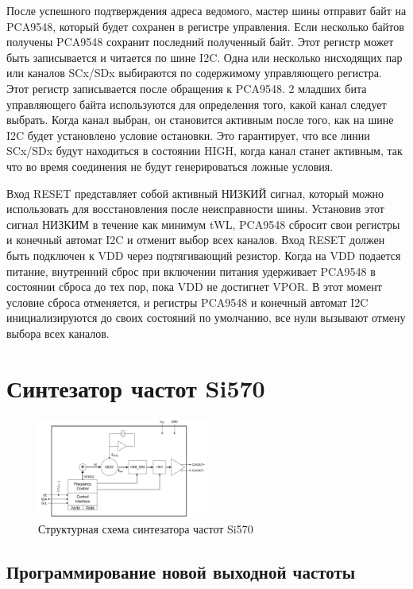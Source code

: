 После успешного подтверждения адреса ведомого,
мастер шины отправит байт на PCA9548, который будет сохранен
в регистре управления. Если несколько байтов получены
PCA9548 сохранит последний полученный байт. Этот регистр может быть
записывается и читается по шине I2C.
Одна или несколько нисходящих пар или каналов SCx/SDx выбираются по содержимому управляющего регистра. Этот регистр записывается после обращения к PCA9548. 2 младших бита управляющего байта используются для определения того, какой канал следует выбрать. Когда канал выбран, он становится активным после того, как на шине I2C будет установлено условие остановки. Это гарантирует, что все линии SCx/SDx будут находиться в состоянии HIGH, когда канал станет активным, так что во время соединения не будут генерироваться ложные условия.

Вход RESET представляет собой активный НИЗКИЙ сигнал, который можно использовать для восстановления после неисправности шины. Установив этот сигнал НИЗКИМ в течение как минимум tWL, PCA9548 сбросит свои регистры и конечный автомат I2C и отменит выбор всех каналов. Вход RESET должен быть подключен к VDD через подтягивающий резистор.
Когда на VDD подается питание, внутренний сброс при включении питания удерживает PCA9548 в состоянии сброса до тех пор, пока VDD не достигнет VPOR. В этот момент условие сброса отменяется, и регистры PCA9548 и конечный автомат I2C инициализируются до своих состояний по умолчанию, все нули вызывают отмену выбора всех каналов.

\section{Синтезатор частот Si570}

\begin{figure}[h]
	\centering
	\includegraphics[width=0.5\textwidth]{image/Si570.png}
	\caption{Структурная схема синтезатора частот Si570}
	\label{Si570.PNG}
\end{figure}

\subsection{Программирование новой выходной частоты}

